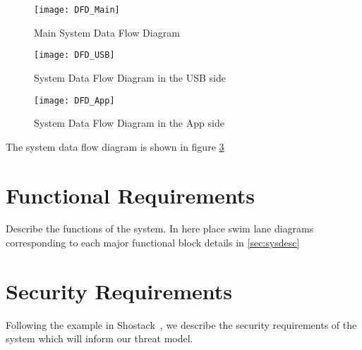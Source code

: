 \begin{figure}
    \centering
    \texttt{[image: DFD\_Main]}
    \caption{Main System Data Flow Diagram}
    \label{fig:dfd}
\end{figure}
\begin{figure}
    \centering
    \texttt{[image: DFD\_USB]}
    \caption{System Data Flow Diagram in the USB side}
    \label{fig:dfd}
\end{figure}
\begin{figure}
    \centering
    \texttt{[image: DFD\_App]}
    \caption{System Data Flow Diagram in the App side}
    \label{fig:dfd}
\end{figure}

The system data flow diagram is shown in figure \ref{fig:dfd}

\section{Functional Requirements}
\label{sec:funcreq}
Describe the functions of the system.  In here place swim lane
diagrams corresponding to each major functional block details in
\ref{sec:sysdesc}

\section{Security Requirements}
\label{sec:secreqs}
Following the example in Shostack~\cite{shostackbook}, we describe the
security requirements of the system which will inform our threat
model.
